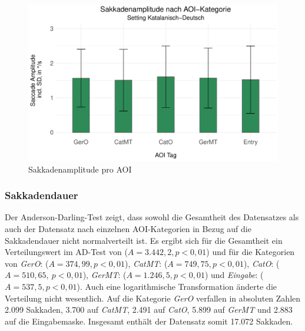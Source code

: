 


\begin{figure}
	\includegraphics[width=.85\textwidth]{Figures/EyeTracking/CatDe/ggplot_boxplot_sacamp_AOI_de}
	\caption{Sakkadenamplitude pro AOI}
	\label{K6:fig:CatDe:sacamp-box}
\end{figure}



\subsubsection{Sakkadendauer}
\label{K6:subsubsec:sacdur:CatDe}


Der Anderson-Darling-Test zeigt, dass sowohl die Gesamtheit des Datensatzes als auch der Datensatz nach einzelnen AOI-Kategorien in Bezug auf die Sakkadendauer nicht normalverteilt ist. Es ergibt sich für die Gesamtheit ein Verteilungswert im AD-Test von ($A = 3.442,2, p < 0,01$) und für die Kategorien von \emph{GerO}: ($A = 374,99, p < 0,01$), \emph{CatMT}: ($A = 749,75, p < 0,01$), \emph{CatO}: ($A = 510,65,\allowbreak\ p < 0,01$), \emph{GerMT}: ($A = 1.246,5, p < 0,01$) und \emph{Eingabe}: ($A = 537,5, p < 0,01$). Auch eine logarithmische Transformation änderte die Verteilung nicht wesentlich. Auf die Kategorie \emph{GerO} verfallen in absoluten Zahlen 2.099 Sakkaden, 3.700 auf \emph{CatMT}, 2.491 auf \emph{CatO}, 5.899 auf \emph{GerMT} und 2.883 auf die Eingabemaske. Insgesamt enthält der Datensatz somit 17.072 Sakkaden.


